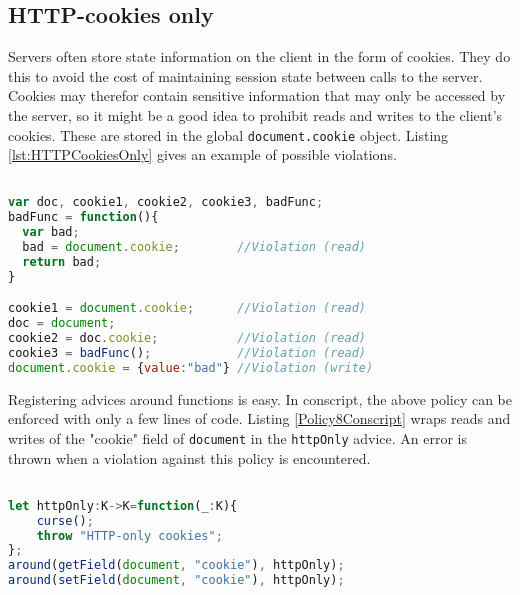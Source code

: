 












\subsection{HTTP-cookies only}
\label{subsec:HTTPOnly}

Servers often store state information on the client in the form of cookies. They do this to avoid the cost of maintaining session state between calls to the server. Cookies may therefor contain sensitive information that may only be accessed by the server, so it might be a good idea to prohibit reads and writes to the client's cookies. These are stored in the global \texttt{document.cookie} object. Listing \ref{lst:HTTPCookiesOnly} gives an example of possible violations.

\begin{lstlisting}[label={lst:HTTPCookiesOnly},language=JavaScript,caption=HTTP-cookies only example,mathescape=true]  % float=t?

var doc, cookie1, cookie2, cookie3, badFunc;
badFunc = function(){
  var bad;
  bad = document.cookie;        //Violation (read)
  return bad;
}

cookie1 = document.cookie;      //Violation (read)
doc = document;
cookie2 = doc.cookie;           //Violation (read)
cookie3 = badFunc();            //Violation (read)
document.cookie = {value:"bad"} //Violation (write)
\end{lstlisting}

Registering advices around functions is easy. In conscript, the above policy can be enforced with only a few lines of code. Listing \ref{Policy8Conscript} wraps reads and writes of the "cookie" field of \texttt{document} in the \texttt{httpOnly} advice. An error is thrown when a violation against this policy is encountered.

\begin{lstlisting}[label={lst:Policy8Conscript},language=JavaScript,caption=Policy 8 in ConScript,mathescape=true]  % float=t?

let httpOnly:K->K=function(_:K){ 
    curse(); 
    throw "HTTP-only cookies"; 
};
around(getField(document, "cookie"), httpOnly); 
around(setField(document, "cookie"), httpOnly);
\end{lstlisting}

